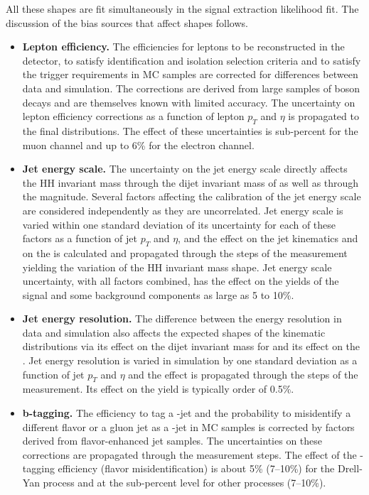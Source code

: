 All these shapes are fit simultaneously in the
signal extraction likelihood fit. The discussion of the bias sources
that affect shapes follows.

\begin{itemize}

\item{\bf Lepton efficiency.} 
The efficiencies for leptons to be
  reconstructed in the detector, to satisfy identification and isolation selection
  criteria and to satisfy the trigger requirements in MC samples are corrected for
  differences between data and simulation. The corrections are derived
  from large samples of \PZ boson decays and are themselves known with
  limited accuracy. The uncertainty on lepton efficiency corrections
  as a function of lepton $p_T$ and $\eta$ is propagated to the final \mTHH distributions. 
  The effect of these uncertainties is sub-percent for the muon
  channel and up to 6\% for the electron channel.

\item{\bf Jet energy scale.}
The uncertainty on the jet energy scale
  directly affects the HH invariant mass through the dijet invariant
  mass of \HBB as well as through the \ETslash magnitude. Several
  factors affecting the calibration of the jet energy scale are
  considered independently as they are uncorrelated. Jet energy scale
  is varied within one standard deviation of its uncertainty for each
  of these factors as a function of jet $p_T$ and $\eta$, and the
  effect on the jet kinematics and on the \ETslash is calculated and
  propagated through the steps of the measurement yielding the
  variation of the HH invariant mass shape.  Jet energy scale
  uncertainty, with all factors combined, has the effect on the yields
  of the signal and some background components as large as 5 to 10\%.

\item{\bf Jet energy resolution.} 
The difference between the energy
  resolution in data and simulation also affects the expected shapes
  of the kinematic distributions via its effect on the dijet invariant
  mass for \HBB and its effect on the \ETslash. Jet energy resolution
  is varied in simulation by one standard deviation as a function of
  jet $p_T$ and $\eta$ and the effect is propagated through the steps
  of the measurement. Its effect on the \mTHH yield is typically order of 0.5\%.

\item{\bf b-tagging.}
The efficiency to tag a \PQb-jet and the
  probability to misidentify a different flavor or a gluon jet as a
  \PQb-jet in MC samples is corrected by factors derived from
  flavor-enhanced jet samples. The uncertainties on these corrections
  are propagated through the measurement steps. The effect of the
  \PQb-tagging efficiency (flavor misidentification) is about 5\% (7--10\%) for the Drell-Yan process and at the sub-percent level for other processes (7--10\%). 


\end{itemize}
